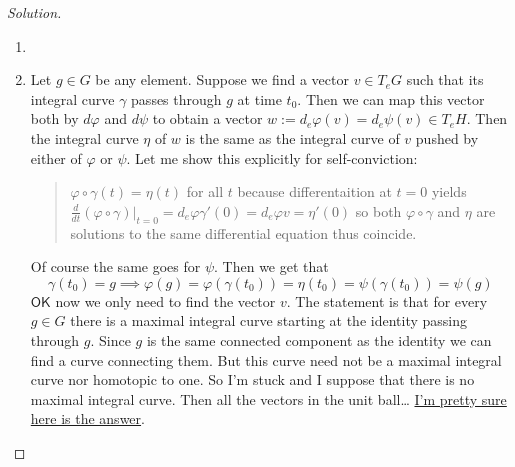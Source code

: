 \begin{proof}[Solution]\leavevmode
	\begin{enumerate}[label=\alph*.]
		\item 

		\item Let $g\in G$ be any element. Suppose we find a vector $v\in T_eG$ such that its integral curve $\gamma$ passes through $g$ at time $t_0$. Then we can map this vector both by $d\varphi$ and $d\psi$ to obtain a vector $w:=d_e\varphi(v)=d_e\psi(v)\in T_eH$. Then the integral curve $\eta$ of  $w$ is the same as the integral curve of $v$ pushed by either of  $\varphi$ or $\psi$. Let me show this explicitly for self-conviction:
			\begin{quotation}
				$\varphi\circ \gamma(t)=\eta(t)$ for all $t$ because differentaition at $t=0$ yields  $\frac{d}{dt}(\varphi\circ \gamma)\Big|_{t=0}=d_e\varphi\gamma'(0)=d_e\varphi v=\eta'(0)$ so both $\varphi\circ \gamma$ and $\eta$ are solutions to the same differential equation thus coincide.
			\end{quotation}
			Of course the same goes for $\psi$. Then we get that
			\[\gamma(t_0)=g\implies \varphi(g)=\varphi(\gamma(t_0))=\eta(t_0)=\psi(\gamma(t_0))=\psi(g)\]
$\mathsf{OK}$ now we only need to find the vector $v$. The statement is that for every $g\in G$ there is a maximal integral curve starting at the identity passing through $g$. Since $g$ is the same connected component as the identity we can find a curve connecting them. But this curve need not be a maximal integral curve nor homotopic to one. So I'm stuck and I suppose that there is no maximal integral curve. Then all the vectors in the unit ball… \href{https://math.stackexchange.com/questions/1258904/how-to-show-that-for-every-element-g-in-a-lie-group-the-curve-gammat-g}{I'm pretty sure here is the answer}.

	\end{enumerate}
\end{proof}

